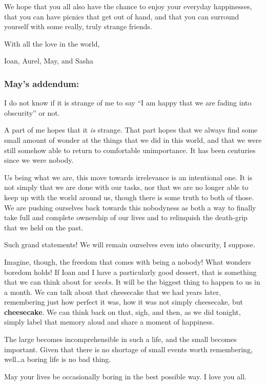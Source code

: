 We hope that you all also have the chance to enjoy your everyday happinesses, that you can have picnics that get out of hand, and that you can surround yourself with some really, truly strange friends.

With all the love in the world,

Ioan, Aurel, May, and Sasha

\hypertarget{mays-addendum}{%
\subsubsection{May's addendum:}\label{mays-addendum}}

I do not know if it is strange of me to say ``I am happy that we are fading into obscurity'' or not.

A part of me hopes that it \emph{is} strange. That part hopes that we always find some small amount of wonder at the things that we did in this world, and that we were still somehow able to return to comfortable unimportance. It has been centuries since we were nobody.

Us being what we are, this move towards irrelevance is an intentional one. It is not simply that we are done with our tasks, nor that we are no longer able to keep up with the world around us, though there is some truth to both of those. We are pushing ourselves back towards this nobodyness as both a way to finally take full and complete ownership of our lives and to relinquish the death-grip that we held on the past.

Such grand statements! We will remain ourselves even into obscurity, I suppose.

Imagine, though, the freedom that comes with being a nobody! What wonders boredom holds! If Ioan and I have a particularly good dessert, that is something that we can think about for \emph{weeks.} It will be the biggest thing to happen to us in a month. We can talk about that cheesecake that we had years later, remembering just how perfect it was, how it was not simply cheesecake, but \textbf{cheesecake}. We can think back on that, sigh, and then, as we did tonight, simply label that memory aloud and share a moment of happiness.

The large becomes incomprehensible in such a life, and the small becomes important. Given that there is no shortage of small events worth remembering, well\ldots{}a boring life is no bad thing.

May your lives be occasionally boring in the best possible way. I love you all.

